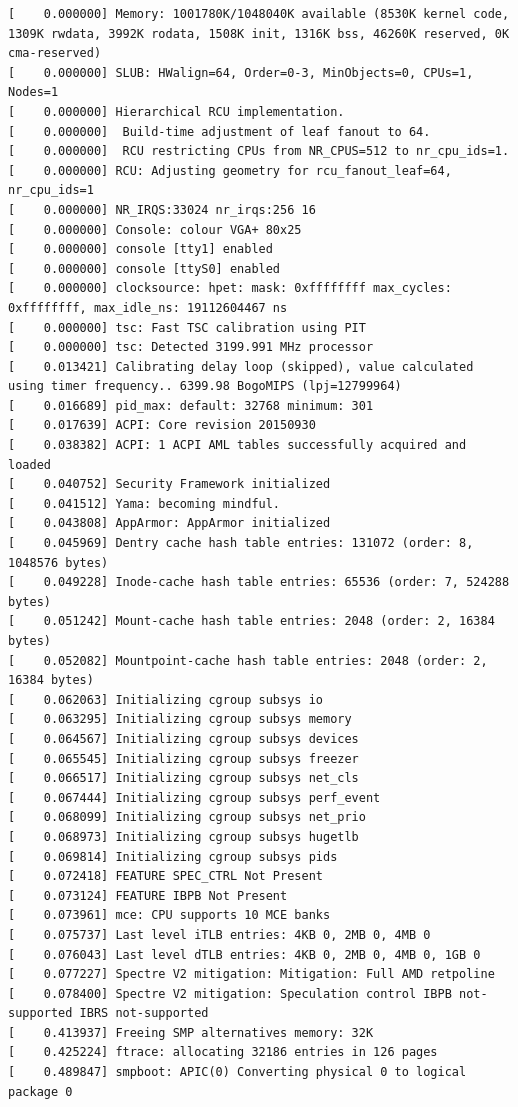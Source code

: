 \documentclass[12pt]{article}
\begin{document}
\begin{verbatim}
[    0.000000] Memory: 1001780K/1048040K available (8530K kernel code, 1309K rwdata, 3992K rodata, 1508K init, 1316K bss, 46260K reserved, 0K cma-reserved)
[    0.000000] SLUB: HWalign=64, Order=0-3, MinObjects=0, CPUs=1, Nodes=1
[    0.000000] Hierarchical RCU implementation.
[    0.000000] 	Build-time adjustment of leaf fanout to 64.
[    0.000000] 	RCU restricting CPUs from NR_CPUS=512 to nr_cpu_ids=1.
[    0.000000] RCU: Adjusting geometry for rcu_fanout_leaf=64, nr_cpu_ids=1
[    0.000000] NR_IRQS:33024 nr_irqs:256 16
[    0.000000] Console: colour VGA+ 80x25
[    0.000000] console [tty1] enabled
[    0.000000] console [ttyS0] enabled
[    0.000000] clocksource: hpet: mask: 0xffffffff max_cycles: 0xffffffff, max_idle_ns: 19112604467 ns
[    0.000000] tsc: Fast TSC calibration using PIT
[    0.000000] tsc: Detected 3199.991 MHz processor
[    0.013421] Calibrating delay loop (skipped), value calculated using timer frequency.. 6399.98 BogoMIPS (lpj=12799964)
[    0.016689] pid_max: default: 32768 minimum: 301
[    0.017639] ACPI: Core revision 20150930
[    0.038382] ACPI: 1 ACPI AML tables successfully acquired and loaded
[    0.040752] Security Framework initialized
[    0.041512] Yama: becoming mindful.
[    0.043808] AppArmor: AppArmor initialized
[    0.045969] Dentry cache hash table entries: 131072 (order: 8, 1048576 bytes)
[    0.049228] Inode-cache hash table entries: 65536 (order: 7, 524288 bytes)
[    0.051242] Mount-cache hash table entries: 2048 (order: 2, 16384 bytes)
[    0.052082] Mountpoint-cache hash table entries: 2048 (order: 2, 16384 bytes)
[    0.062063] Initializing cgroup subsys io
[    0.063295] Initializing cgroup subsys memory
[    0.064567] Initializing cgroup subsys devices
[    0.065545] Initializing cgroup subsys freezer
[    0.066517] Initializing cgroup subsys net_cls
[    0.067444] Initializing cgroup subsys perf_event
[    0.068099] Initializing cgroup subsys net_prio
[    0.068973] Initializing cgroup subsys hugetlb
[    0.069814] Initializing cgroup subsys pids
[    0.072418] FEATURE SPEC_CTRL Not Present
[    0.073124] FEATURE IBPB Not Present
[    0.073961] mce: CPU supports 10 MCE banks
[    0.075737] Last level iTLB entries: 4KB 0, 2MB 0, 4MB 0
[    0.076043] Last level dTLB entries: 4KB 0, 2MB 0, 4MB 0, 1GB 0
[    0.077227] Spectre V2 mitigation: Mitigation: Full AMD retpoline
[    0.078400] Spectre V2 mitigation: Speculation control IBPB not-supported IBRS not-supported
[    0.413937] Freeing SMP alternatives memory: 32K
[    0.425224] ftrace: allocating 32186 entries in 126 pages
[    0.489847] smpboot: APIC(0) Converting physical 0 to logical package 0

\end{verbatim}
\end{document}
